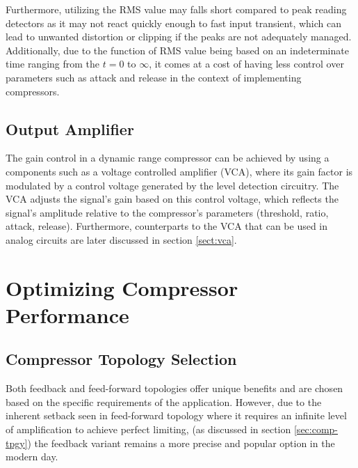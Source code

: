 \documentclass[10pt]{article}
\begin{document}
\begin{multicols*}{2}
                     

                    Furthermore, utilizing the RMS value may falls short compared to peak reading detectors as it may not react quickly enough to fast input transient, which can lead to unwanted distortion or clipping if the peaks are not adequately managed. Additionally, due to the function of RMS value being based on an indeterminate time ranging from the $t=0$ to $\infty$, it comes at a cost of having less control over parameters such as attack and release in the context of implementing compressors.

            \subsection{Output Amplifier}
                The gain control in a dynamic range compressor can be achieved by using a components such as a voltage controlled amplifier (VCA),  where its gain factor is modulated by a control voltage generated by the level detection circuitry. The VCA adjusts the signal's gain based on this control voltage, which reflects the signal's amplitude relative to the compressor's parameters (threshold, ratio, attack, release). Furthermore, counterparts to the VCA that can be used in analog circuits are later discussed in section \ref{sect:vca}.
        


        \section[Optimizing Compressor Performance]{Optimizing Compressor\\Performance}
            
            \subsection{Compressor Topology Selection}
                Both feedback and feed-forward topologies offer unique benefits and are chosen based on the specific requirements of the application. However, due to the inherent setback seen in feed-forward topology where it requires an infinite level of amplification to achieve perfect limiting, (as discussed in section \ref{sec:comp-tpgy}) the feedback variant remains a more precise and popular option in the modern day.\par

\end{multicols*}
\end{document}
